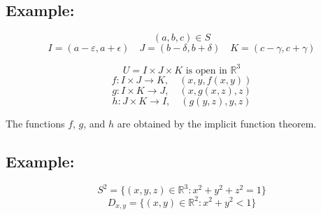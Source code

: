 \documentclass[11pt]{article}
\begin{document}
\subsection*{Example:}
\[
(a,b,c) \in S
\]
\[
I = (a - \varepsilon, a + \epsilon) \quad J = (b - \delta, b + \delta) \quad K = (c - \gamma, c + \gamma)
\]

\[
U = I \times J \times K \text{ is open in } \mathbb{R}^3
\]
\[
f : I \times J \rightarrow K, \quad (x,y,f(x,y))
\]
\[
g : I \times K \rightarrow J, \quad (x,g(x,z),z)
\]
\[
h : J \times K \rightarrow I, \quad (g(y,z),y,z)
\]

The functions $f$, $g$, and $h$ are obtained by the implicit function theorem. 

\subsection*{Example:}
\[
S^2 = \{(x,y,z) \in \mathbb{R}^3 : x^2 + y^2 + z^2 = 1\}
\]
\[
D_{x,y} = \{(x,y) \in \mathbb{R}^2 : x^2 + y^2 < 1\}
\]
\end{document}
